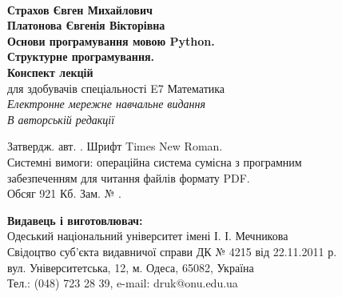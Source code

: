 

\pagestyle{empty} %


	
	\begin{center}
		\vspace{4.5cm}
		
		\\
		{\fontsize{14pt}{16pt}\selectfont \textbf{Страхов Євген Михайлович \\
		Платонова Євгенія Вікторівна}}\\[2.5em]
		
		{\fontsize{20pt}{20pt}\selectfont \textbf{Основи програмування  мовою Python.\\ Структурне програмування.}} \\[1.5em]
		
		{\fontsize{18pt}{16pt}\selectfont \textbf{ Конспект лекцій }} \\
		{\fontsize{12pt}{14pt}\selectfont для здобувачів спеціальності E7 Математика } \\[1.5em]
		
		{\fontsize{12pt}{14pt}\selectfont \textit{Електронне мережне навчальне видання}} \\[1.5em]
		
		{\fontsize{12pt}{14pt}\selectfont \textit{В авторській редакції}}
		
		\vspace{7.5cm}
		
		{\fontsize{10pt}{13pt}\selectfont
			Затвердж. авт.   . Шрифт Times New Roman. \\
			Системні вимоги: операційна система сумісна з програмним \\
			забезпеченням для читання файлів формату PDF. \\
			Обсяг 921 Кб. Зам. № .
		}
		
			\vspace{2.5cm}
		
		{\fontsize{10pt}{13pt}\selectfont
			\textbf{Видавець і виготовлювач:} \\
			Одеський національний університет імені І. І. Мечникова \\
			Свідоцтво суб’єкта видавничої справи ДК № 4215 від 22.11.2011 р. \\
			вул. Університетська, 12, м. Одеса, 65082, Україна \\
			Тел.: (048) 723 28 39, e-mail: druk@onu.edu.ua
		}
	\end{center}
